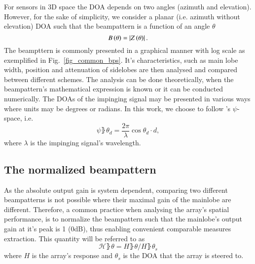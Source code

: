 For sensors in 3D space the DOA depends on two angles (azimuth and elevation).
However, for the sake of simplicity, we consider a planar (i.e. azimuth without elevation) DOA such that the beampattern is a function of an angle $\theta$
\begin{equation}
B\left({\theta}\right) = \left\vert Z\left({\theta}\right)\right\vert.
\end{equation}
The beampttern is commonly presented in a graphical manner with log scale as exemplified in Fig.~\ref{fig_common_bps}.
It's characteristics, such as main lobe width, position and attenuation of sidelobes are then analysed and compared between different schemes.
The analysis can be done theoretically, when the beampattern's mathematical expression is known or it can be conducted numerically.
The DOAs of the impinging signal may be presented in various ways where units may be degrees or radians.
In this work, we choose to follow \cite{van2004optimum}'s $\psi$-space, i.e.
\begin{equation}
    \psi\rBrace{\theta_{d}}=\frac{2\pi}{\lambda}\cos{\theta_{d}}\cdot{}d,
\end{equation}
where $\lambda$ is the impinging signal's wavelength.
\subsection{The normalized beampattern}
As the absolute output gain is system dependent, comparing two different beampatterns is not possible where their maximal gain of the mainlobe are different.
Therefore, a common practice \cite{van2004optimum} when analysing the array's spatial performance, is to normalize the beampattern such that the mainlobe's output gain at it's peak is 1 (0dB), thus enabling convenient comparable measures extraction.
This quantity will be referred to as $$\mathcal{H}\rBrace{\theta} = H\rBrace{\theta}/H\rBrace{\theta_{s}}$$ where $H$ is the array's response and $\theta_{s}$ is the DOA that the array is steered to.

